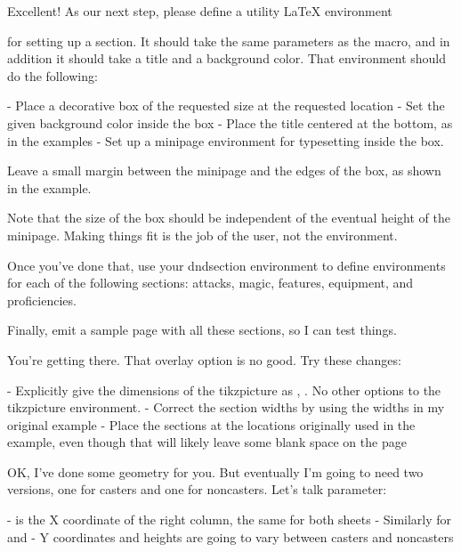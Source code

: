 Excellent!  As our next step, please define a utility {\LaTeX}
environment \begin{dndsection} for setting up a section.  It should take the same parameters as the \dndbox macro, and in addition it should take a title and a background color.   That environment should do the following:

  - Place a decorative box of the requested size at the requested location
  - Set the given background color inside the box
  - Place the title centered at the bottom, as in the examples
  - Set up a minipage environment for typesetting inside the box.

Leave a small margin between the minipage and the edges of the box, as shown in the example.

Note that the size of the box should be independent of the eventual height of the minipage.  Making things fit is the job of the user, not the environment.

Once you've done that, use your dndsection environment to define environments for each of the following sections:
attacks, magic, features, equipment, and proficiencies.

Finally, emit a sample page with all these sections, so I can test things.






You're getting there.  That overlay option is no good.  Try these changes:

  - Explicitly give the dimensions of the tikzpicture as \textwidth, \textheight.  No other options to the tikzpicture environment.
  - Correct the section widths by using the widths in my original example
  - Place the sections at the locations originally used in the example, even though that will likely leave some blank space on the page


OK, I've done some geometry for you.  But eventually I'm going to need
two versions, one for casters and one for noncasters.  Let's talk
parameter:

  - \rightx is the X coordinate of the right column, the same for both sheets
  - Similarly for \rightwidth and \leftwidth
  - Y coordinates and heights are going to vary between casters and noncasters


\end{dndsection}
